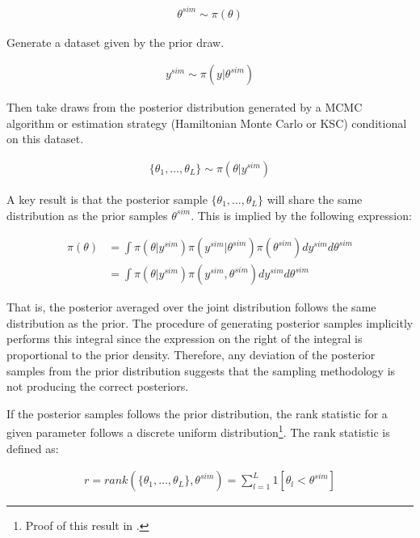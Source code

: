 \documentclass[12pt, a4paper]{article}
\begin{document}
        $$
        \begin{aligned}
        \theta^{sim} \sim \pi(\theta)
        \end{aligned}
        $$

        Generate a dataset given by the prior draw.

        $$
        \begin{aligned}
        y^{sim} \sim \pi (y|\theta^{sim})
        \end{aligned}
        $$

        Then take draws from the posterior distribution generated by a MCMC algorithm or estimation strategy (Hamiltonian Monte Carlo or KSC) conditional on this dataset.

        $$
        \begin{aligned}
        \{\theta_1,\dots , \theta_{L}\} \sim \pi (\theta | y^{sim})
        \end{aligned}
        $$

        A key result is that the posterior sample $\{\theta_1,\dots , \theta_{L}\}$ will share the same distribution as the prior samples $\theta^{sim}$. This is implied by the following expression:

        $$
        \begin{aligned}
        \pi(\theta) &= \int \pi(\theta|y^{sim}) \pi(y^{sim}|\theta^{sim}) \pi(\theta^{sim})dy^{sim} d\theta^{sim} \\
        &= \int \pi(\theta|y^{sim}) \pi(y^{sim},\theta^{sim}) dy^{sim} d\theta^{sim}
        \end{aligned}
        $$

        That is, the posterior averaged over the joint distribution follows the same distribution as the prior. The procedure of generating posterior samples implicitly performs this integral since the expression on the right of the integral is proportional to the prior density. Therefore, any deviation of the posterior samples from the prior distribution suggests that the sampling methodology is not producing the correct posteriors.

        If the posterior samples follows the prior distribution, the rank statistic for a given parameter follows a discrete uniform distribution\footnote{Proof of this result in \citet{talts2018validating}.}. The rank statistic is defined as:

        $$
        \begin{aligned}
        r = rank(\{\theta_1,\dots , \theta_{L}\}, \theta^{sim}) = \sum_{l=1}^{L}1[\theta_{l} < \theta^{sim}]
        \end{aligned}
        $$
\end{document}

